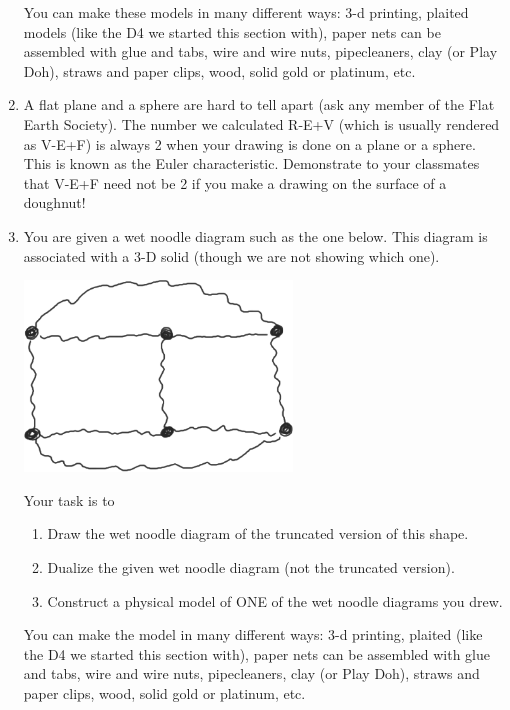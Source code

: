 \begin{enumerate}
 You can make these models in many different ways:  3-d printing, plaited models (like the D4 we started this section with), paper nets can be assembled with glue and tabs, wire and wire nuts, pipecleaners, clay (or Play Doh), straws and paper clips, wood, solid gold or platinum, etc.

       

  
\item A flat plane and a sphere are hard to tell apart (ask any member of the Flat Earth Society).  The number we calculated R-E+V (which is usually rendered as V-E+F) is always 2 when your drawing is done on a plane or a sphere.  This is known as the Euler characteristic.  Demonstrate to your classmates that V-E+F need not be 2 if you make a drawing on the surface of a doughnut!


\wbnewpage
\item You are given a wet noodle diagram such as the one below. This diagram is associated with a 3-D solid (though we are not showing which one).
\begin{center}
    \includegraphics[height=2in]{images/WND-hamburger}
\end{center}
Your task is to
\begin{enumerate}
	\item Draw the wet noodle diagram of the truncated version of this shape.
	\item Dualize the given wet noodle diagram (not the truncated version).
	\item Construct a physical model of ONE of the wet noodle diagrams you drew.
\end{enumerate}
You can make the model in many different ways:  3-d printing, plaited (like the D4 we started this section with), paper nets can be assembled with glue and tabs, wire and wire nuts, pipecleaners, clay (or Play Doh), straws and paper clips, wood, solid gold or platinum, etc.


\end{enumerate}
